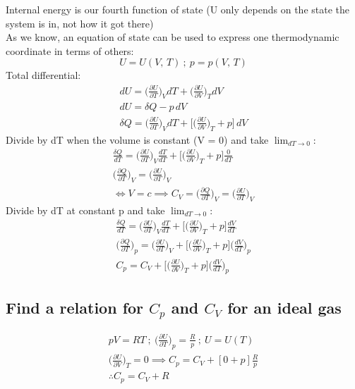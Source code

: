 \documentclass[a4paper, 11pt, normalem]{report}
\newcommand\p{\partial}
\begin{document}
Internal energy is our fourth function of state (U only depends on the state the system is in, not how it got there) \\
As we know, an equation of state can be used to express one thermodynamic coordinate in terms of others:
\begin{equation*}
    U = U(V,\,T) ~;~ p = p(V,\,T)
\end{equation*}
Total differential:
\begin{gather*}
    dU = \Big(\frac{\p U}{\p T} \Big)_V dT + \Big(\frac{\p U}{\p V} \Big)_T dV \\
    dU = \delta Q - p\,dV \\
    \delta Q = \Big(\frac{\p U}{\p T} \Big)_V dT + \Bigg[\Big(\frac{\p U}{\p V} \Big)_T + p \Bigg]\,dV
\end{gather*}
Divide by dT when the volume is constant (V = 0) and take $\lim_{dT \to 0}$:
\begin{gather*}
    \frac{\delta Q}{dT} = \Big(\frac{\p U}{\p T} \Big)_{V} \frac{dT}{dT} + \Bigg[\Big(\frac{\p U}{\p V} \Big)_T + p \Bigg]\frac{0}{dT} \\
    \Big(\frac{\p Q}{\p T} \Big)_V = \Big(\frac{\p U}{\p T} \Big)_{V} \\
    \iff V = c \implies C_{V} = \Big(\frac{\p Q}{\p T} \Big)_{V} = \Big(\frac{\p U}{\p T} \Big)_{V}
\end{gather*}
Divide by dT at constant p and take $\lim_{dT \to 0}$:
\begin{gather*}
    \frac{\delta Q}{dT} = \Big(\frac{\p U}{\p T} \Big)_{V} \frac{dT}{dT} + \Bigg[\Big(\frac{\p U}{\p V} \Big)_T + p \Bigg]\frac{dV}{dT} \\
    \Big(\frac{\p Q}{\p T} \Big)_{p} = \Big(\frac{\p U}{\p T} \Big)_{V} + \Bigg[\Big(\frac{\p U}{\p V} \Big)_T + p \Bigg] \Big(\frac{dV}{dT} \Big)_{p} \\
    C_p = C_V + \Bigg[\Big(\frac{\p U}{\p V} \Big)_T + p \Bigg] \Big(\frac{dV}{dT} \Big)_{p}
\end{gather*}

\subsection{ Find a relation for $C_p$ and $C_V$ for an ideal gas}
\begin{gather*}
    pV = RT ~;~ \Big(\frac{\p U}{\p T} \Big)_{p} = \frac{R}{p} ~;~ U = U(T) \\
    \Big(\frac{\p U}{\p V} \Big)_{T} = 0 \implies C_p = C_V + [0 + p]\frac{R}{p} \\
    \therefore C_p = C_V + R
\end{gather*}
\end{document}
